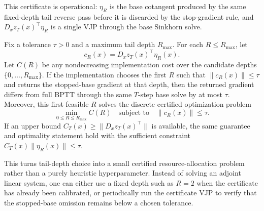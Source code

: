 This certificate is operational: $\eta_R$ is the base cotangent produced by the same fixed-depth tail reverse pass before it is discarded by the stop-gradient rule, and $D_xz_T(x)^\top\eta_R$ is a single VJP through the base Sinkhorn solve.

\begin{corollary}\label{cor:certified_tail_depth}
Fix a tolerance $\tau>0$ and a maximum tail depth $R_{\max}$. For each $R\le R_{\max}$, let
\[
c_R(x)=D_xz_T(x)^\top\eta_R(x).
\]
Let $C(R)$ be any nondecreasing implementation cost over the candidate depths $\{0,\ldots,R_{\max}\}$. If the implementation chooses the first $R$ such that $\|c_R(x)\|\le \tau$ and returns the stopped-base gradient at that depth, then the returned gradient differs from full BPTT through the same $T$-step base solve by at most $\tau$. Moreover, this first feasible $R$ solves the discrete certified optimization problem
\[
\min_{0\le R\le R_{\max}} C(R)
\quad\text{subject to}\quad
\|c_R(x)\|\le \tau .
\]
If an upper bound $C_T(x)\ge\|D_xz_T(x)^\top\|$ is available, the same guarantee and optimality statement hold with the sufficient constraint $C_T(x)\|\eta_R(x)\|\le\tau$.
\end{corollary}

This turns tail-depth choice into a small certified resource-allocation problem rather than a purely heuristic hyperparameter. Instead of solving an adjoint linear system, one can either use a fixed depth such as $R=2$ when the certificate has already been calibrated, or periodically run the certificate VJP to verify that the stopped-base omission remains below a chosen tolerance.

